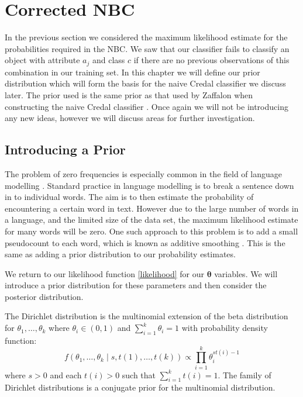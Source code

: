 \chapter{Corrected NBC}

In the previous section we considered the maximum likelihood estimate for the probabilities required in the NBC.
We saw that our classifier fails to classify an object with attribute $a_j$ and class $c$ if there are no previous observations of this combination in our training set.
In this chapter we will define our prior distribution which will form the basis for the naive Credal classifier we discuss later.
The prior used is the same prior as that used by Zaffalon when constructing the naive Credal classifier \cite{Zaffalon01}.
Once again we will not be introducing any new ideas, however we will discuss areas for further investigation.

\section{Introducing a Prior}
The problem of zero frequencies is especially common in the field of language modelling \cite{Chen96}.
Standard practice in language modelling is to break a sentence down in to individual words.
The aim is to then estimate the probability of encountering a certain word in text.
However due to the large number of words in a language, and the limited size of the data set, the maximum likelihood estimate for many words will be zero.
One such approach to this problem is to add a small pseudocount to each word, which is known as additive smoothing \cite{Manning08}.
This is the same as adding a prior distribution to our probability estimates.

We return to our likelihood function \cref{likelihood} for our $\mathbf{\theta}$ variables.
We will introduce a prior distribution for these parameters and then consider the posterior distribution.

The Dirichlet distribution is the multinomial extension of the beta distribution for $\theta_1,\dots,\theta_k$ where $\theta_i \in (0,1)$ and $\sum_{i=1}^k \theta_i = 1$ with probability density function:
\begin{equation} \label{dirichlet_pdf}
	f(\theta_1,\dots,\theta_k \mid s, t(1),\dots,t(k)) \propto \prod_{i=1}^k \theta_i^{st(i) - 1}
\end{equation}
where $s > 0$ and each $t(i)>0$ such that $\sum_{i=1}^{k}t(i) = 1$.
The family of Dirichlet distributions is a conjugate prior for the multinomial distribution.


